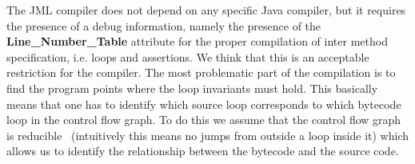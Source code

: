 The JML compiler does not depend on any specific Java compiler, but it requires the presence of a debug information, namely the presence of the \textbf{Line\_Number\_Table} attribute for the proper compilation of inter method specification, i.e. loops and assertions. We think that this is an acceptable restriction for the compiler. The most problematic part of the compilation is to find the program points where the loop invariants must hold. This basically means that one has to identify which source loop corresponds to which bytecode loop in the control flow graph. To do this we assume that the control flow graph is reducible~\cite{ARUCom1986} (intuitively this means no jumps from outside a loop inside it) which allows us to identify the relationship between the bytecode and the source code. 
